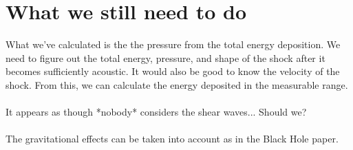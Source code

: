 \documentclass{article}
\newcommand*\te[1]{\text{#1}}
\newcommand*\p[1]{\left(#1\right)}
\newcommand*\f[2]{\frac{#1}{#2}}
\begin{document}
\pagebreak
\section{What we still need to do}
What we've calculated is the the pressure from the total energy deposition. We need to figure out the total energy, pressure, and shape of the shock after it becomes sufficiently acoustic. It would also be good to know the velocity of the shock. From this, we can calculate the energy deposited in the measurable range.
\\\\
It appears as though *nobody* considers the shear waves... Should we?
\\\\
The gravitational effects can be taken into account as in the Black Hole paper.
\end{document}
